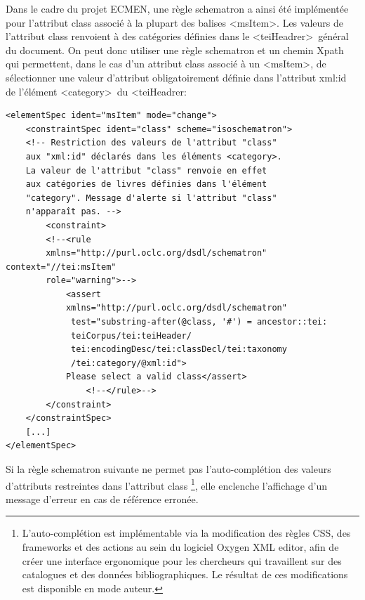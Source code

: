 \documentclass[a4paper,12pt,twoside]{book}
\begin{document}
	Dans le cadre du projet ECMEN, une règle schematron a ainsi été implémentée pour l'attribut class associé à la plupart des balises \textless msItem\textgreater . Les valeurs de l'attribut class renvoient à des catégories définies dans le \textless teiHeadrer\textgreater~général du document. On peut donc utiliser une règle schematron et un chemin Xpath qui permettent, dans le cas d'un attribut class associé à un \textless msItem\textgreater, de sélectionner une valeur d'attribut obligatoirement définie dans l'attribut xml:id de l'élément \textless category\textgreater~du \textless teiHeadrer\textgeater : 
	\begin{verbatim}
<elementSpec ident="msItem" mode="change">
    <constraintSpec ident="class" scheme="isoschematron">
    <!-- Restriction des valeurs de l'attribut "class" 
    aux "xml:id" déclarés dans les éléments <category>. 
    La valeur de l'attribut "class" renvoie en effet 
    aux catégories de livres définies dans l'élément 
    "category". Message d'alerte si l'attribut "class" 
    n'apparaît pas. -->
        <constraint>
        <!--<rule 
        xmlns="http://purl.oclc.org/dsdl/schematron" context="//tei:msItem" 
        role="warning">-->
            <assert 
            xmlns="http://purl.oclc.org/dsdl/schematron" 
             test="substring-after(@class, '#') = ancestor::tei:
             teiCorpus/tei:teiHeader/
             tei:encodingDesc/tei:classDecl/tei:taxonomy
             /tei:category/@xml:id">
            Please select a valid class</assert> 
                <!--</rule>-->
        </constraint>
    </constraintSpec>
    [...]
</elementSpec>
	\end{verbatim}
	Si la règle schematron suivante ne permet pas l'auto-complétion des valeurs d’attributs restreintes dans l’attribut class {}\footnote{L'auto-complétion est implémentable via la modification des règles CSS, des frameworks et des actions au sein du logiciel Oxygen XML editor, afin de créer une interface ergonomique pour les chercheurs qui travaillent sur des catalogues et des données bibliographiques. Le résultat de ces modifications est disponible en mode auteur.}, elle enclenche l'affichage d'un message d’erreur en cas de référence erronée.\\
	
\end{document}
